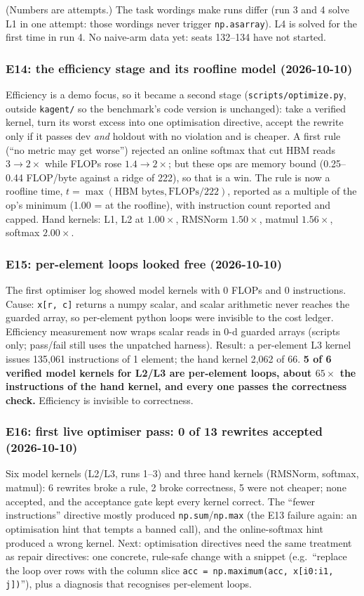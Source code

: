 \documentclass[11pt]{article}
\newcommand{\code}[1]{\texttt{#1}}
\newcommand{\entry}[2]{\subsubsection*{#1 \textnormal{\small(#2)}}}
\begin{document}
\medskip
(Numbers are attempts.) The task wordings make runs differ (run 3 and 4 solve L1 in one attempt:
those wordings never trigger \code{np.asarray}). L4 is solved for the first time in run 4. No naive-arm
data yet: seats 132--134 have not started.

\entry{E14: the efficiency stage and its roofline model}{2026-10-10}
Efficiency is a demo focus, so it became a second stage (\code{scripts/optimize.py}, outside
\code{kagent/} so the benchmark's code version is unchanged): take a verified kernel, turn its worst
excess into one optimisation directive, accept the rewrite only if it passes dev \emph{and} holdout
with no violation and is cheaper. A first rule (``no metric may get worse'') rejected an online
softmax that cut HBM reads $3\to2\times$ while FLOPs rose $1.4\to2\times$; but these ops are memory
bound (0.25--0.44 FLOP/byte against a ridge of 222), so that is a win. The rule is now a roofline
time, $t=\max(\text{HBM bytes}, \text{FLOPs}/222)$, reported as a multiple of the op's minimum
(1.00 = at the roofline), with instruction count reported and capped. Hand kernels: L1, L2 at
$1.00\times$, RMSNorm $1.50\times$, matmul $1.56\times$, softmax $2.00\times$.

\entry{E15: per-element loops looked free}{2026-10-10}
The first optimiser log showed model kernels with 0 FLOPs and 0 instructions. Cause: \code{x[r, c]}
returns a numpy scalar, and scalar arithmetic never reaches the guarded array, so per-element
python loops were invisible to the cost ledger. Efficiency measurement now wraps scalar reads in 0-d
guarded arrays (scripts only; pass/fail still uses the unpatched harness). Result: a per-element
L3 kernel issues 135{,}061 instructions of 1 element; the hand kernel 2{,}062 of 66. \textbf{5 of 6
verified model kernels for L2/L3 are per-element loops, about $65\times$ the instructions of the hand
kernel, and every one passes the correctness check.} Efficiency is invisible to correctness.

\entry{E16: first live optimiser pass: 0 of 13 rewrites accepted}{2026-10-10}
Six model kernels (L2/L3, runs 1--3) and three hand kernels (RMSNorm, softmax, matmul): 6 rewrites
broke a rule, 2 broke correctness, 5 were not cheaper; none accepted, and the acceptance gate kept
every kernel correct. The ``fewer instructions'' directive mostly produced \code{np.sum}/\code{np.max}
(the E13 failure again: an optimisation hint that tempts a banned call), and the online-softmax hint
produced a wrong kernel. Next: optimisation directives need the same treatment as repair directives:
one concrete, rule-safe change with a snippet (e.g.\ ``replace the loop over rows with the column slice
\code{acc = np.maximum(acc, x[i0:i1, j])}''), plus a diagnosis that recognises per-element loops.
\end{document}
